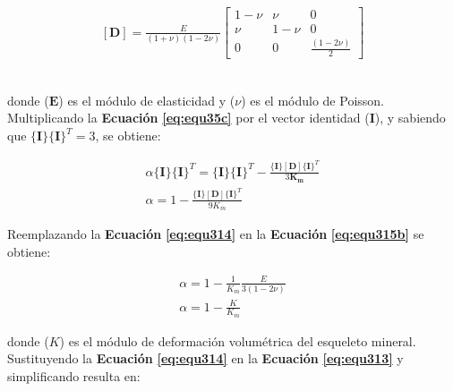 \begin{ceqn} %
\begin{gather}\label{eq:equ314}
[\mathbf{D}]
=
\frac{E}{(1+\nu)(1-2\nu)}
\begin{bmatrix}
       1-\nu   & \nu     & 0 \\[0.3em]
       \nu	   & 1-\nu   & 0 \\[0.3em]
       0       & 0       &\frac{(1-2\nu)}{2}
\end{bmatrix}
\end{gather}   
\end{ceqn}
\\
donde ($\mathbf{E}$) es el módulo de elasticidad y ($\nu$) es el módulo de Poisson. Multiplicando la \textbf{Ecuación} \textbf{\ref{eq:equ35c}} por el vector identidad ($\mathbf{I}$), y sabiendo que $\{\mathbf{I}\}\{\mathbf{I}\}^T=3$, se obtiene:

\begin{ceqn} 
\begin{subequations} \label{eq:equ315} 
\begin{gather}
\alpha\{\mathbf{I}\}\{\mathbf{I}\}^T = \{\mathbf{I}\}\{\mathbf{I}\}^T - \frac{\{\mathbf{I}\}[\mathbf{D}]\{\mathbf{I}\}^T}{3\mathbf{K_m}} \label{eq:equ315a} \\[10pt]
\alpha=1-\frac{\{\mathbf{I}\}[\mathbf{D}]\{\mathbf{I}\}^T}{9K_m} \label{eq:equ315b} 
\end{gather}  
\end{subequations} 
\end{ceqn}
\bigskip

Reemplazando la \textbf{Ecuación} \textbf{\ref{eq:equ314}} en la  \textbf{Ecuación} \textbf{\ref{eq:equ315b}} se obtiene:

\begin{ceqn} 
\begin{subequations} \label{eq:equ316} 
\begin{gather}
\alpha=1-\frac{1}{K_m}\frac{E}{3(1-2\nu)} \label{eq:equ316a} \\[10pt]
\alpha=1-\frac{K}{K_m} \label{eq:equ316b} 
\end{gather}  
\end{subequations} 
\end{ceqn}
donde ($K$) es el módulo de deformación volumétrica del esqueleto mineral. Sustituyendo la \textbf{Ecuación} \textbf{\ref{eq:equ314}} en la \textbf{Ecuación} \textbf{\ref{eq:equ313}} y simplificando resulta en:


